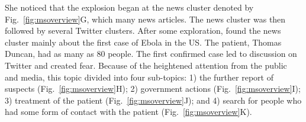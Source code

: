 She noticed that the explosion began at the news cluster denoted by Fig.~\ref{fig:msoverview}G, which  many news articles.
The news cluster was then followed by several Twitter clusters.
After some exploration,  found  the news cluster  mainly about the first case of Ebola in the US.
The patient, Thomas Duncan, had  as many as 80 people.
The first confirmed case led to  discussion on Twitter
and created fear.
Because of the heightened attention from the public and media, this topic  divided into four sub-topics:
1) the further report of suspects (Fig.~\ref{fig:msoverview}H);
2) government actions (Fig.~\ref{fig:msoverview}I);
3) treatment of the patient (Fig.~\ref{fig:msoverview}J);
and 4)  search for people who had some form of contact with the patient (Fig.~\ref{fig:msoverview}K).

